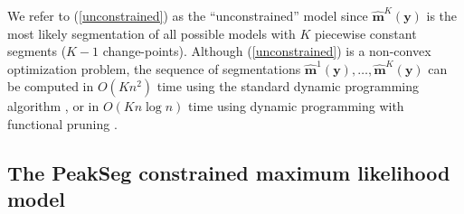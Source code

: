 \documentclass{article}
\begin{document}
We refer to (\ref{unconstrained}) as the ``unconstrained'' model
since $\mathbf{\hat m}^K(\mathbf y)$ is the most likely segmentation
of all possible models with $K$ piecewise constant segments ($K-1$
change-points). 
Although (\ref{unconstrained}) is a non-convex optimization problem,
the sequence of segmentations
$\mathbf{\hat m}^1(\mathbf y), \dots, \mathbf{\hat m}^{K}(\mathbf y)$
can be computed in $O(K n^2)$ time using the standard dynamic
programming algorithm \citep{bellman}, or in $O(K n \log n)$ time
using dynamic programming with functional pruning \citep{pruned-dp,
  johnson, Segmentor}.

\subsection{The PeakSeg constrained maximum likelihood model}
\label{sec:constrained}
\end{document}
